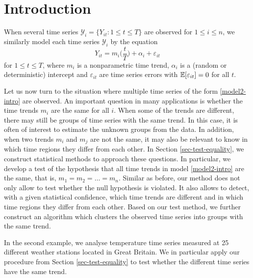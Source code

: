 
\section{Introduction}\label{sec-intro}

When several time series $\mathcal{Y}_i = \{ Y_{it}: 1 \le t \le T \}$ are observed for $1 \le i \le n$, we similarly model each time series $\mathcal{Y}_i$ by the equation
\begin{equation}\label{model2-intro}
Y_{it} = m_i \Big( \frac{t}{T} \Big) + \alpha_i + \varepsilon_{it}
\end{equation}
for $1 \le t \le T$, where $m_i$ is a nonparametric time trend, $\alpha_i$ is a (random or deterministic) intercept and $\varepsilon_{it}$ are time series errors with $\mathbb{E}[\varepsilon_{it}] = 0$ for all $t$.

Let us now turn to the situation where multiple time series of the form \eqref{model2-intro} are observed. An important question in many applications is whether the time trends $m_i$ are the same for all $i$. When some of the trends are different, there may still be groups of time series with the same trend. In this case, it is often of interest to estimate the unknown groups from the data. In addition, when two trends $m_i$ and $m_j$ are not the same, it may also be relevant to know in which time regions they differ from each other. In Section \ref{sec-test-equality}, we construct statistical methods to approach these questions. In particular, we develop a test of the hypothesis that all time trends in model \eqref{model2-intro} are the same, that is, $m_1 = m_2 = \ldots = m_n$. Similar as before, our method does not only allow to test whether the null hypothesis is violated. It also allows to detect, with a given statistical confidence, which time trends are different and in which time regions they differ from each other. Based on our test method, we further construct an algorithm which clusters the observed time series into groups with the same trend. 

In the second example, we analyse temperature time series measured at 25 different weather stations located in Great Britain. We in particular apply our procedure from Section \ref{sec-test-equality} to test whether the different time series have the same trend. 